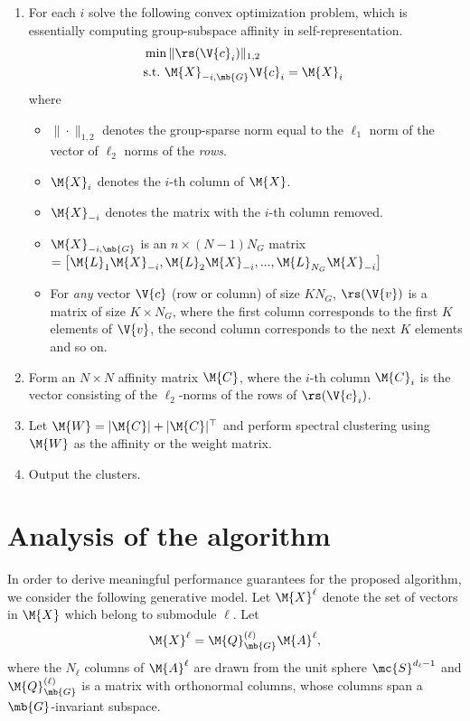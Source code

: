 \documentclass[conference]{IEEEtran}
\begin{document}
\begin{enumerate}
\item For each $i$ solve the following convex optimization problem, which is essentially computing group-subspace affinity in self-representation. 
\begin{align}
&\min \| \rs(\V{c}_i)\|_{1,2} \nonumber \\
& \mbox{s.t.}\,\, \M{X}_{-i,\mb{G}}\V{c}_i = \M{X}_i \,\, 
\end{align}
where
\begin{itemize}
\item $\| \cdot \|_{1,2}$ denotes the group-sparse norm equal to the $\ell_1$ norm of the vector of $\ell_2$ norms of the \emph{rows}.
\item $\M{X}_i$ denotes the $i$-th column of $\M{X}$.
\item $\M{X}_{-i}$ denotes the matrix with the $i$-th column removed. 
\item $\M{X}_{-i,\mb{G}}$ is an $n \times (N-1)N_G$ matrix $=  \left[ \M{L}_1 \M{X}_{-i}, \M{L}_2 \M{X}_{-i}, ..., \M{L}_{N_G} \M{X}_{-i} \right]$
\item For \emph{any} vector $\V{c}$ (row or column) of size $K N_G$, $\rs(\V{v})$ is a matrix of size $K \times N_G$, where the first column corresponds to the first $K$ elements of $\V{v}$, the second column corresponds to the next $K$ elements and so on. 
\end{itemize}

\item Form an $N \times N$ affinity matrix $\M{C}$, where the $i$-th column $\M{C}_{i}$ is the vector consisting of the $\ell_2$-norms of the rows of $\rs(\V{c}_i)$. 

\item Let $\M{W} = |\M{C}| + |\M{C}|^\top$ and perform spectral clustering \cite{njwspectral,Luxburg:2007dq}  using $\M{W}$ as the affinity or the weight matrix. 

\item Output the clusters. 
\end{enumerate}

\section{Analysis of the algorithm}
\label{sec:analysis}

In order to derive meaningful performance guarantees for the proposed algorithm, we consider the following generative model. Let $\M{X}^\ell$ denote the set of vectors in $\M{X}$ which belong to submodule $\ell$. Let $$ \M{X}^\ell = \M{Q}_{\mb{G}}^{(\ell)} \M{A}^{\ell} ,$$ where the $N_\ell$ columns of $\M{A}^\ell$ are drawn from the unit sphere $\mc{S}^{d_\ell-1}$ and $\M{Q}_{\mb{G}}^{(\ell)}$ is a matrix with orthonormal columns, whose columns span a $\mb{G}$-invariant subspace. 
\end{document}
